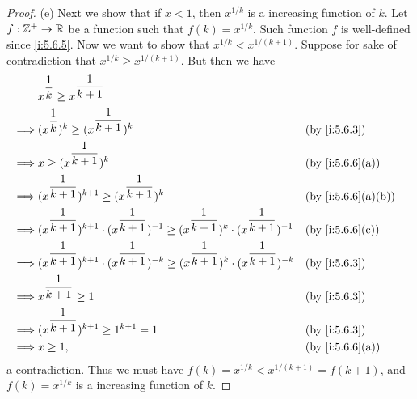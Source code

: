 \begin{proof}{(e)}
  Next we show that if \(x < 1\), then \(x^{1 / k}\) is a increasing function of \(k\).
  Let \(f : \mathbb{Z}^+ \to \mathbb{R}\) be a function such that \(f(k) = x^{1 / k}\).
  Such function \(f\) is well-defined since \cref{i:5.6.5}.
  Now we want to show that \(x^{1 / k} < x^{1 / (k + 1)}\).
  Suppose for sake of contradiction that \(x^{1 / k} \geq x^{1 / (k + 1)}\).
  But then we have
  \begin{align*}
             & x^{\dfrac{1}{k}} \geq x^{\dfrac{1}{k + 1}}                                                                                                              \\
    \implies & (x^{\dfrac{1}{k}})^k \geq (x^{\dfrac{1}{k + 1}})^k                                                                               &  & \by{i:5.6.3}      \\
    \implies & x \geq (x^{\dfrac{1}{k + 1}})^k                                                                                                  &  & \by{i:5.6.6}[a]   \\
    \implies & (x^{\dfrac{1}{k + 1}})^{k + 1} \geq (x^{\dfrac{1}{k + 1}})^k                                                                     &  & \by{i:5.6.6}[a,b] \\
    \implies & (x^{\dfrac{1}{k + 1}})^{k + 1} \cdot (x^{\dfrac{1}{k + 1}})^{-1} \geq (x^{\dfrac{1}{k + 1}})^k \cdot (x^{\dfrac{1}{k + 1}})^{-1} &  & \by{i:5.6.6}[c]   \\
    \implies & (x^{\dfrac{1}{k + 1}})^{k + 1} \cdot (x^{\dfrac{1}{k + 1}})^{-k} \geq (x^{\dfrac{1}{k + 1}})^k \cdot (x^{\dfrac{1}{k + 1}})^{-k} &  & \by{i:5.6.3}      \\
    \implies & x^{\dfrac{1}{k + 1}} \geq 1                                                                                                      &  & \by{i:5.6.3}      \\
    \implies & (x^{\dfrac{1}{k + 1}})^{k + 1} \geq 1^{k + 1} = 1                                                                                &  & \by{i:5.6.3}      \\
    \implies & x \geq 1,                                                                                                                        &  & \by{i:5.6.6}[a]
  \end{align*}
  a contradiction.
  Thus we must have \(f(k) = x^{1 / k} < x^{1 / (k + 1)} = f(k + 1)\), and \(f(k) = x^{1 / k}\) is a increasing function of \(k\).


\end{proof}
